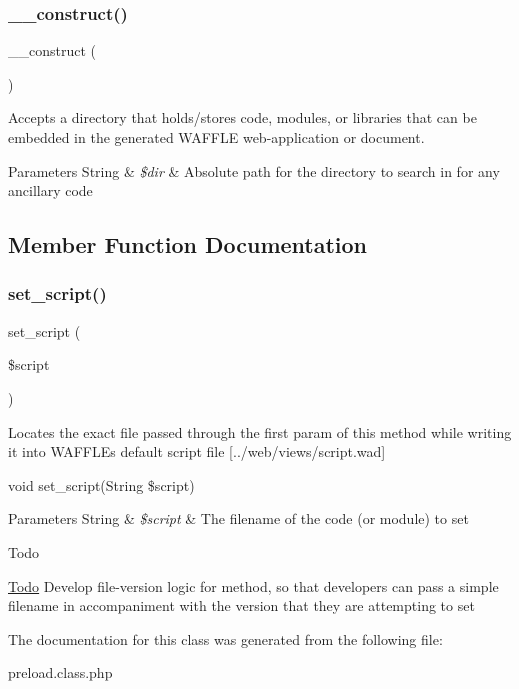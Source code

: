 \subsubsection{\texorpdfstring{\+\_\+\+\_\+construct()}{\_\_construct()}}
{\footnotesize\ttfamily \+\_\+\+\_\+construct (\begin{DoxyParamCaption}{ }\end{DoxyParamCaption})}

Accepts a directory that holds/stores code, modules, or libraries that can be embedded in the generated W\+A\+F\+F\+LE web-\/application or document.


\begin{DoxyParams}[1]{Parameters}
String & {\em \$dir} & Absolute path for the directory to search in for any ancillary code \\
\hline
\end{DoxyParams}


\subsection{Member Function Documentation}
\mbox{\label{class_w_a_f_f_l_e_1_1_framework_1_1_i_o_1_1_preload_aa570cf9af0fc24953f4568db3a71ae7b}} 
\subsubsection{\texorpdfstring{set\+\_\+script()}{set\_script()}}
{\footnotesize\ttfamily set\+\_\+script (\begin{DoxyParamCaption}\item[{}]{\$script }\end{DoxyParamCaption})}

Locates the exact file passed through the first param of this method while writing it into W\+A\+F\+F\+LE\textquotesingle{}s default script file \mbox{[}../web/views/script.wad\mbox{]}

void set\+\_\+script(String \$script)


\begin{DoxyParams}[1]{Parameters}
String & {\em \$script} & The filename of the code (or module) to set\\
\hline
\end{DoxyParams}
\begin{DoxyRefDesc}{Todo}
\item[\hyperlink{todo__todo000005}{Todo}]Develop file-\/version logic for method, so that developers can pass a simple filename in accompaniment with the version that they are attempting to set \end{DoxyRefDesc}


The documentation for this class was generated from the following file\+:\begin{DoxyCompactItemize}
\item 
preload.\+class.\+php\end{DoxyCompactItemize}
